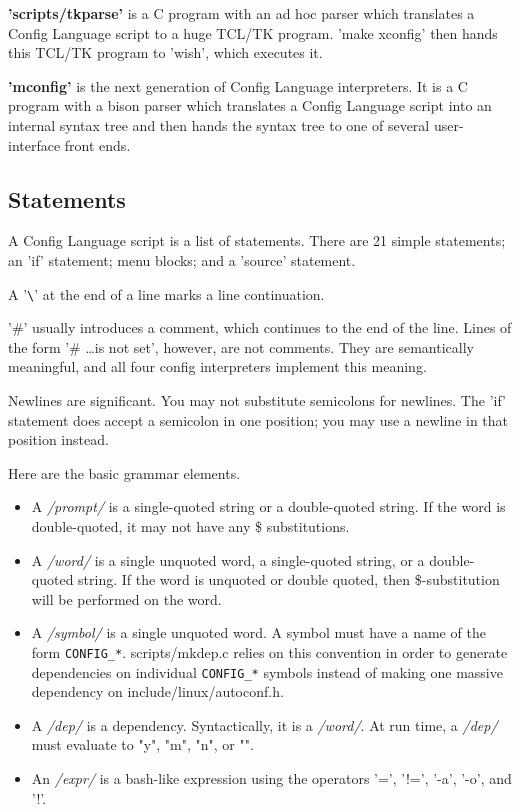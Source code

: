 \textbf{'scripts/tkparse'} is a C program with an ad hoc parser which translates
a Config Language script to a huge TCL/TK program.  'make xconfig'
then hands this TCL/TK program to 'wish', which executes it.

\textbf{'mconfig'} is the next generation of Config Language interpreters.  It is a
C program with a bison parser which translates a Config Language script
into an internal syntax tree and then hands the syntax tree to one of
several user-interface front ends.



\subsection{Statements}

A Config Language script is a list of statements.  There are 21 simple
statements; an 'if' statement; menu blocks; and a 'source' statement.

A '\verb"\"' at the end of a line marks a line continuation.

'\#' usually introduces a comment, which continues to the end of the line.
Lines of the form '\# \dots is not set', however, are not comments.  They
are semantically meaningful, and all four config interpreters implement
this meaning.

Newlines are significant.  You may not substitute semicolons for newlines.
The 'if' statement does accept a semicolon in one position; you may use
a newline in that position instead.

Here are the basic grammar elements.
\begin{itemize}

\item  A \textit{/prompt/} is a single-quoted string or a double-quoted string.
    If the word is double-quoted, it may not have any \$ substitutions.

\item A \textit{/word/} is a single unquoted word, a single-quoted string, or a
    double-quoted string.  If the word is unquoted or double quoted,
    then \$-substitution will be performed on the word.

\item A \textit{/symbol/} is a single unquoted word.  A symbol must have a name of
    the form \texttt{CONFIG\_*}.  scripts/mkdep.c relies on this convention in order
    to generate dependencies on individual \texttt{CONFIG\_*} symbols instead of
    making one massive dependency on include/linux/autoconf.h.

\item A \textit{/dep/} is a dependency.  Syntactically, it is a \textit{/word/}.
    At run
    time, a \textit{/dep/} must evaluate to "y", "m", "n", or "".

\item An \textit{/expr/} is a bash-like expression using the operators
    '=', '!=', '-a', '-o', and '!'.

\end{itemize}

